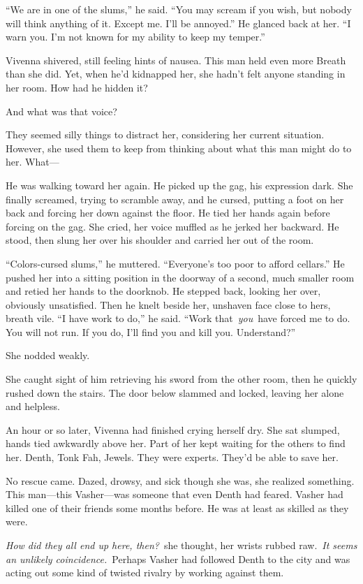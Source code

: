 “We are in one of the slums,” he said. “You may scream if you wish, but nobody will think anything of it. Except me. I’ll be annoyed.” He glanced back at her. “I warn you. I’m not known for my ability to keep my temper.”

Vivenna shivered, still feeling hints of nausea. This man held even more Breath than she did. Yet, when he’d kidnapped her, she hadn’t felt anyone standing in her room. How had he hidden it?

And what was that voice?

They seemed silly things to distract her, considering her current situation. However, she used them to keep from thinking about what this man might do to her. What—

He was walking toward her again. He picked up the gag, his expression dark. She finally screamed, trying to scramble away, and he cursed, putting a foot on her back and forcing her down against the floor. He tied her hands again before forcing on the gag. She cried, her voice muffled as he jerked her backward. He stood, then slung her over his shoulder and carried her out of the room.

“Colors-cursed slums,” he muttered. “Everyone’s too poor to afford cellars.” He pushed her into a sitting position in the doorway of a second, much smaller room and retied her hands to the doorknob. He stepped back, looking her over, obviously unsatisfied. Then he knelt beside her, unshaven face close to hers, breath vile. “I have work to do,” he said. “Work that~\textit{you}~have forced me to do. You will not run. If you do, I’ll find you and kill you. Understand?”

She nodded weakly.

She caught sight of him retrieving his sword from the other room, then he quickly rushed down the stairs. The door below slammed and locked, leaving her alone and helpless.

\orn

An hour or so later, Vivenna had finished crying herself dry. She sat slumped, hands tied awkwardly above her. Part of her kept waiting for the others to find her. Denth, Tonk Fah, Jewels. They were experts. They’d be able to save her.

No rescue came. Dazed, drowsy, and sick though she was, she realized something. This man—this Vasher—was someone that even Denth had feared. Vasher had killed one of their friends some months before. He was at least as skilled as they were.

\textit{How did they all end up here, then?}~she thought, her wrists rubbed raw.~\textit{It seems an unlikely coincidence.}~Perhaps Vasher had followed Denth to the city and was acting out some kind of twisted rivalry by working against them.

